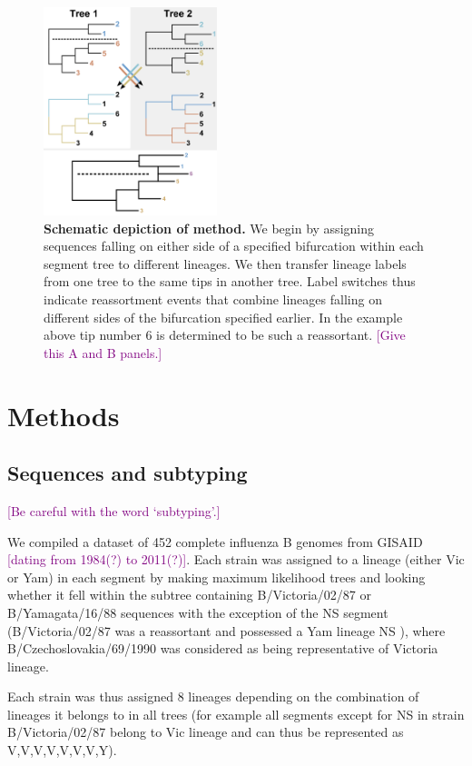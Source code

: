 \documentclass[11pt,oneside,letterpaper]{article}
\def\tbc#1{\textcolor{purple}{[#1]}}
\begin{document}
\begin{figure}[h]
 \centering		
	\includegraphics[width=0.45\textwidth]{figures/TreeFigure2}
	\caption{\textbf{Schematic depiction of method.}
We begin by assigning sequences falling on either side of a specified bifurcation within each segment tree to different lineages.
We then transfer lineage labels from one tree to the same tips in another tree.
Label switches thus indicate reassortment events that combine lineages falling on different sides of the bifurcation specified earlier.
In the example above tip number 6 is determined to be such a reassortant. \tbc{Give this A and B panels.}}
	\label{methodFig}
\end{figure}

\section*{Methods}

\subsection*{Sequences and subtyping}

\tbc{Be careful with the word `subtyping'.}

We compiled a dataset of 452 complete influenza B genomes from GISAID \cite{GISAID} \tbc{dating from 1984(?) to 2011(?)}. 
Each strain was assigned to a lineage (either Vic or Yam) in each segment by making maximum likelihood trees and looking whether it fell within the subtree containing B/Victoria/02/87 or B/Yamagata/16/88 sequences with the exception of the NS segment (B/Victoria/02/87 was a reassortant and possessed a Yam lineage NS \cite{lindstrom1999}), where B/Czechoslovakia/69/1990 was considered as being representative of Victoria lineage.

Each strain was thus assigned 8 lineages depending on the combination of lineages it belongs to in all trees (for example all segments except for NS in strain B/Victoria/02/87 belong to Vic lineage and can thus be represented as V,V,V,V,V,V,V,Y). 
\end{document}
